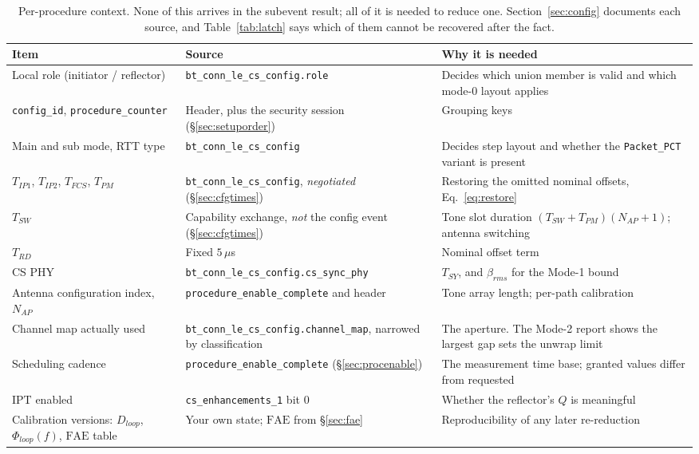 \documentclass[11pt,a4paper]{article}
\newcommand{\us}{\,\ensuremath{\upmu}s}
\newcommand{\code}[1]{\texttt{\small #1}}
\newcommand{\FAE}{\ensuremath{\mathrm{FAE}}}
\newcommand{\IPT}{\ensuremath{\mathrm{IPT}}}
\newcommand{\Nap}{\ensuremath{N_{AP}}}
\providecommand{\upmu}{\mu}
\newcommand{\Tsy}{\ensuremath{T_{SY}}}
\newcommand{\Trd}{\ensuremath{T_{RD}}}
\newcommand{\Tpm}{\ensuremath{T_{PM}}}
\newcommand{\Tsw}{\ensuremath{T_{SW}}}
\begin{document}
\begin{table}[h]
\caption{Per-procedure context. None of this arrives in the subevent result; all of it is needed to
reduce one. Section~\ref{sec:config} documents each source, and Table~\ref{tab:latch} says which of
them cannot be recovered after the fact.}
\label{tab:ctx}
\centering\scriptsize
\begin{tabular}{@{}L{46mm}L{44mm}L{48mm}@{}}
\toprule
Item & Source & Why it is needed \\
\midrule
Local role (initiator / reflector) & \code{bt\_\allowbreak{}conn\_\allowbreak{}le\_\allowbreak{}cs\_\allowbreak{}config.role} & Decides which union member is valid and which mode-0 layout applies \\
\code{config\_\allowbreak{}id}, \code{procedure\_\allowbreak{}counter} & Header, plus the security session (\S\ref{sec:setuporder}) & Grouping keys \\
Main and sub mode, RTT type & \code{bt\_\allowbreak{}conn\_\allowbreak{}le\_\allowbreak{}cs\_\allowbreak{}config} & Decides step layout and whether the \code{Packet\_\allowbreak{}PCT} variant is present \\
$T_{IP1}$, $T_{IP2}$, $T_{FCS}$, $\Tpm$ & \code{bt\_\allowbreak{}conn\_\allowbreak{}le\_\allowbreak{}cs\_\allowbreak{}config}, \emph{negotiated} (\S\ref{sec:cfgtimes}) & Restoring the omitted nominal offsets, Eq.~\eqref{eq:restore} \\
$\Tsw$ & Capability exchange, \emph{not} the config event (\S\ref{sec:cfgtimes}) & Tone slot duration $(\Tsw+\Tpm)(\Nap+1)$; antenna switching \\
$\Trd$ & Fixed $5$\us & Nominal offset term \\
CS PHY & \code{bt\_\allowbreak{}conn\_\allowbreak{}le\_\allowbreak{}cs\_\allowbreak{}config.cs\_\allowbreak{}sync\_\allowbreak{}phy} & $\Tsy$, and $\beta_{rms}$ for the Mode-1 bound \\
Antenna configuration index, $\Nap$ & \code{procedure\_\allowbreak{}enable\_\allowbreak{}complete} and header & Tone array length; per-path calibration \\
Channel map actually used & \code{bt\_\allowbreak{}conn\_\allowbreak{}le\_\allowbreak{}cs\_\allowbreak{}config.channel\_\allowbreak{}map}, narrowed by classification & The aperture. The Mode-2 report shows the largest gap sets the unwrap limit \\
Scheduling cadence & \code{procedure\_\allowbreak{}enable\_\allowbreak{}complete} (\S\ref{sec:procenable}) & The measurement time base; granted values differ from requested \\
\IPT{} enabled & \code{cs\_\allowbreak{}enhancements\_\allowbreak{}1} bit 0 & Whether the reflector's $Q$ is meaningful \\
Calibration versions: $D_{loop}$, $\Phi_{loop}(f)$, $\FAE$ table & Your own state; $\FAE$ from \S\ref{sec:fae} & Reproducibility of any later re-reduction \\
\bottomrule
\end{tabular}
\end{table}
\end{document}
